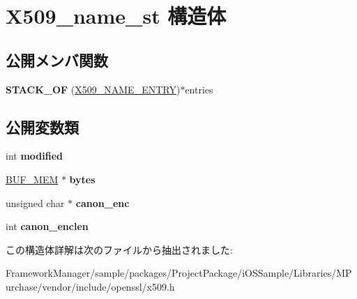 \hypertarget{struct_x509__name__st}{}\section{X509\+\_\+name\+\_\+st 構造体}
\label{struct_x509__name__st}
\subsection*{公開メンバ関数}
\begin{DoxyCompactItemize}
\item 
\hypertarget{struct_x509__name__st_a309fcb2ef5136df31912ba38a423fbd0}{}{\bfseries S\+T\+A\+C\+K\+\_\+\+O\+F} (\hyperlink{struct_x509__name__entry__st}{X509\+\_\+\+N\+A\+M\+E\+\_\+\+E\+N\+T\+R\+Y})$\ast$entries\label{struct_x509__name__st_a309fcb2ef5136df31912ba38a423fbd0}

\end{DoxyCompactItemize}
\subsection*{公開変数類}
\begin{DoxyCompactItemize}
\item 
\hypertarget{struct_x509__name__st_a1bbfbc394e6971bc55d4f9ec4c22ae44}{}int {\bfseries modified}\label{struct_x509__name__st_a1bbfbc394e6971bc55d4f9ec4c22ae44}

\item 
\hypertarget{struct_x509__name__st_a673c31a6033851f510b2e74770f43224}{}\hyperlink{structbuf__mem__st}{B\+U\+F\+\_\+\+M\+E\+M} $\ast$ {\bfseries bytes}\label{struct_x509__name__st_a673c31a6033851f510b2e74770f43224}

\item 
\hypertarget{struct_x509__name__st_af5bcedafa7eb3039090945fec07a0ed7}{}unsigned char $\ast$ {\bfseries canon\+\_\+enc}\label{struct_x509__name__st_af5bcedafa7eb3039090945fec07a0ed7}

\item 
\hypertarget{struct_x509__name__st_a264a0973bed1cf3905e3f12b5af1d269}{}int {\bfseries canon\+\_\+enclen}\label{struct_x509__name__st_a264a0973bed1cf3905e3f12b5af1d269}

\end{DoxyCompactItemize}


この構造体詳解は次のファイルから抽出されました\+:\begin{DoxyCompactItemize}
\item 
Framework\+Manager/sample/packages/\+Project\+Package/i\+O\+S\+Sample/\+Libraries/\+M\+Purchase/vendor/include/openssl/x509.\+h\end{DoxyCompactItemize}
